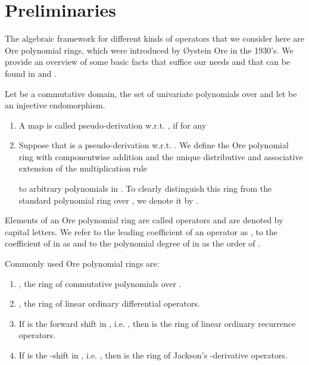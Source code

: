 \documentclass[3p,11pt,preprint]{elsarticle}
\begin{document}
\section{Preliminaries}
\label{prelimsec}

The algebraic framework for different kinds of operators that we consider here are Ore polynomial rings, which were introduced by \O ystein Ore in the 1930's. We provide an overview of some basic facts that suffice our needs and that can be found in \citet{ore} and \citet{bronstein}.
\begin{definition}
Let  be a commutative domain,  the set of univariate polynomials over  and let  be an injective endomorphism.
\begin{enumerate}
 \item  A map  is called pseudo-derivation w.r.t. , if for any  

 \item Suppose that  is a pseudo-derivation w.r.t. . We define the Ore polynomial ring  with componentwise addition and the unique distributive and associative extension of the multiplication rule

 to arbitrary polynomials in . To clearly distinguish this ring from the standard polynomial ring over , we denote it by .
\end{enumerate}
\end{definition}

 Elements of an Ore polynomial ring are called operators and are denoted by capital letters. We refer to the leading coefficient of an operator  as , to the coefficient of  in  as  and to the polynomial degree of  in  as the order  of . 

\begin{example}
\label{oreex} Commonly used Ore polynomial rings are:
 \begin{enumerate}
  \item , the ring of commutative polynomials over .
  \item , the ring of linear ordinary differential operators.
  \item If  is the forward shift in , i.e. , then  is the ring of linear ordinary recurrence operators.
  \item If  is the -shift in , i.e. , then  is the ring of Jackson's -derivative operators.
 \end{enumerate}
\end{example}
\end{document}
